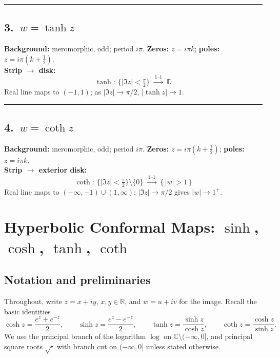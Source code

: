 \documentclass[11pt]{article}
\begin{document}
\bigskip\hrule\bigskip

\subsection*{3.\ $w=\tanh z$}
\textbf{Background:} meromorphic, odd; period $i\pi$. \quad
\textbf{Zeros:} $z=i\pi k$; \textbf{poles:} $z=i\pi(k+\tfrac12)$.\\
\textbf{Strip $\to$ disk:}
\[
\boxed{\,\tanh:\ \{|\Im z|<\tfrac{\pi}{2}\}\ \xrightarrow{\ 1\text{--}1\ }\ \mathbb D\,}
\]
Real line maps to $(-1,1)$; as $|\Im z|\to\pi/2$, $|\tanh z|\to1$.

\bigskip\hrule\bigskip

\subsection*{4.\ $w=\coth z$}
\textbf{Background:} meromorphic, odd; period $i\pi$. \quad
\textbf{Zeros:} $z=i\pi(k+\tfrac12)$; \textbf{poles:} $z=i\pi k$.\\
\textbf{Strip $\to$ exterior disk:}
\[
\boxed{\,\coth:\ \{|\Im z|<\tfrac{\pi}{2}\}\setminus\{0\}\ \xrightarrow{\ 1\text{--}1\ }\ \{\,|w|>1\,\}\,}
\]
Real line maps to $(-\infty,-1)\cup(1,\infty)$; $|\Im z|\to\pi/2$ gives $|w|\to1^+$.




\section*{Hyperbolic Conformal Maps: $\sinh$, $\cosh$, $\tanh$, $\coth$}

\subsection*{Notation and preliminaries}
Throughout, write $z=x+iy$, $x,y\in\mathbb R$, and $w=u+iv$ for the image.
Recall the basic identities
\[
\cosh z=\frac{e^{z}+e^{-z}}{2},\qquad
\sinh z=\frac{e^{z}-e^{-z}}{2},\qquad
\tanh z=\frac{\sinh z}{\cosh z},\qquad
\coth z=\frac{\cosh z}{\sinh z}.
\]
We use the principal branch of the logarithm $\log$ on $\mathbb C\setminus(-\infty,0]$, and principal square roots $\sqrt{\cdot}$ with branch cut on $(-\infty,0]$ unless stated otherwise.
\end{document}
